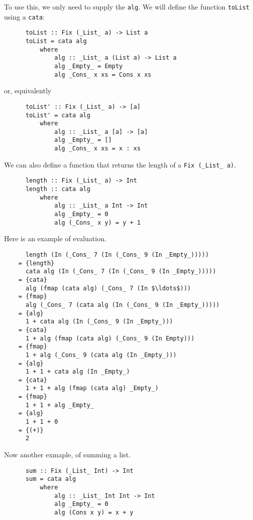 \documentclass[a4paper,12pt]{article}
\theoremstyle{remark}
\begin{document}
  To use this, we only need to supply the \lstinline{alg}. We will define the function \lstinline{toList}
  using a \lstinline{cata}:

  \begin{lstlisting}
      toList :: Fix (_List_ a) -> List a
      toList = cata alg
          where
              alg :: _List_ a (List a) -> List a
              alg _Empty_ = Empty
              alg _Cons_ x xs = Cons x xs  \end{lstlisting}

  or, equivalently

  \begin{lstlisting}
      toList' :: Fix (_List_ a) -> [a]
      toList' = cata alg
          where
              alg :: _List_ a [a] -> [a]
              alg _Empty_ = []
              alg _Cons_ x xs = x : xs  \end{lstlisting}

  We can also define a function that returns the length of a \lstinline{Fix (_List_ a)}.

  \begin{lstlisting}
      length :: Fix (_List_ a) -> Int
      length :: cata alg
          where
              alg :: _List_ a Int -> Int
              alg _Empty_ = 0
              alg (_Cons_ x y) = y + 1  \end{lstlisting}

  Here is an example of evaluation.

  \begin{lstlisting}
      length (In (_Cons_ 7 (In (_Cons_ 9 (In _Empty_)))))
    = {length}
      cata alg (In (_Cons_ 7 (In (_Cons_ 9 (In _Empty_)))))
    = {cata}
      alg (fmap (cata alg) (_Cons_ 7 (In $\ldots$)))
    = {fmap}
      alg (_Cons_ 7 (cata alg (In (_Cons_ 9 (In _Empty_)))))
    = {alg}
      1 + cata alg (In (_Cons_ 9 (In _Empty_)))
    = {cata}
      1 + alg (fmap (cata alg) (_Cons_ 9 (In Empty)))
    = {fmap}
      1 + alg (_Cons_ 9 (cata alg (In _Empty_)))
    = {alg}
      1 + 1 + cata alg (In _Empty_)
    = {cata}
      1 + 1 + alg (fmap (cata alg) _Empty_)
    = {fmap}
      1 + 1 + alg _Empty_
    = {alg}
      1 + 1 + 0
    = {(+)}
      2  \end{lstlisting}

  Now another exmaple, of summing a list.

  \begin{lstlisting}
      sum :: Fix (_List_ Int) -> Int
      sum = cata alg
          where
              alg :: _List_ Int Int -> Int
              alg _Empty_ = 0
              alg (Cons x y) = x + y  \end{lstlisting}
\end{document}
